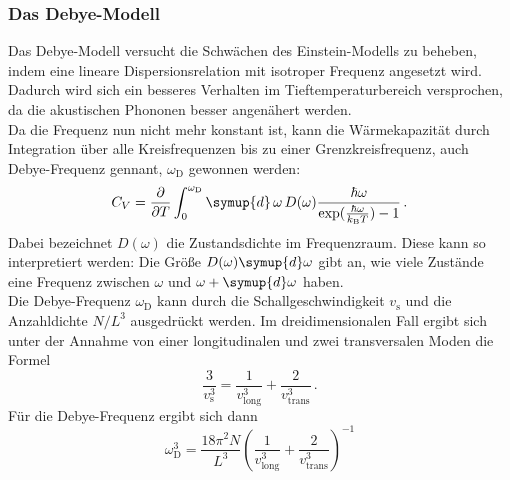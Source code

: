 \subsubsection{Das Debye-Modell}
Das Debye-Modell versucht die Schwächen des Einstein-Modells zu beheben, indem eine lineare Dispersionsrelation mit isotroper Frequenz angesetzt wird. Dadurch wird sich ein besseres Verhalten im Tieftemperaturbereich versprochen, da die akustischen Phononen besser angenähert werden.\\
Da die Frequenz nun nicht mehr konstant ist, kann die Wärmekapazität durch Integration über alle Kreisfrequenzen bis zu einer Grenzkreisfrequenz, auch Debye-Frequenz gennant, $\omega_\text{D}$ gewonnen werden:
\begin{equation}
  C_V = \frac{\partial}{\partial T} \int_0^{\omega_\text{D}} \symup{d}\,\omega \, D(\omega) \frac{\hbar \omega}{\exp(\frac{\hbar \omega}{k_\text{B} T}) - 1}\,.
  \label{eqn:startOfDebye}
\end{equation}
Dabei bezeichnet $D(\omega)$ die Zustandsdichte im Frequenzraum. Diese kann so interpretiert werden: Die Größe $D(\omega) \symup{d}\omega$ gibt an, wie viele Zustände eine Frequenz zwischen $\omega$ und $\omega + \symup{d}\omega$ haben.\\
Die Debye-Frequenz $\omega_\text{D}$ kann durch die Schallgeschwindigkeit $v_\text{s}$ und die Anzahldichte $N/L^3$ ausgedrückt werden. Im dreidimensionalen Fall ergibt sich unter der Annahme von einer longitudinalen und zwei transversalen Moden die Formel
\begin{equation}
  \frac{3}{v_\text{s}^3} = \frac{1}{v_\text{long}^3} + \frac{2}{v_\text{trans}^3}\,.
  \label{eqn:schallgeschwindigkeit}
\end{equation}
Für die Debye-Frequenz ergibt sich dann
\begin{equation}
  \omega_{\text{D}}^3 = \frac{18 \pi^2 N}{L^3} \left( \frac{1}{v_\text{long}^3} + \frac{2}{v_\text{trans}^3} \right)^{-1}
\end{equation}

